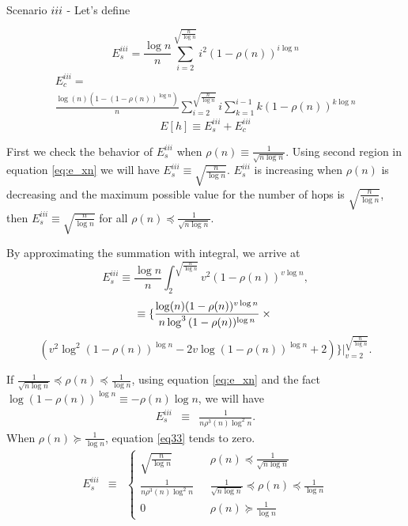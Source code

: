 \documentclass[journal]{IEEEtran}
\theoremstyle{plain}
\theoremstyle{remark}
\begin{document}
\begin{IEEEproof}
Scenario $\romannumeral 3$ - Let's define

\begin{equation}\label{eq33}
E_s^{iii}= \frac{\log n}{n}\sum_{i=2}^{\sqrt{\frac{n}{\log n}}} i^2(1-\rho(n))^{i\log n} \nonumber 
\end{equation}
\begin{eqnarray}
&E_c^{iii}= & \nonumber \\
&\frac{\log (n)(1-(1-\rho(n))^{\log n})}{n}\sum_{i=2}^{\sqrt{\frac{n}{\log n}}}i\sum_{k=1}^{i-1}k(1-\rho(n))^{k\log n}& \nonumber 
\end{eqnarray}
\begin{equation}
E[h]\equiv E_s^{iii}+E_c^{iii}
	\end{equation}
	
	First we check the behavior of $E_s^{iii}$ when $\rho(n)\equiv \frac{1}{\sqrt{n\log n}}$. Using second region in equation \eqref{eq:e_xn} we will have $E_s^{iii}\equiv \sqrt{\frac{n}{\log n}}$. $E_s^{iii}$ is increasing when $\rho(n)$ is decreasing and the maximum possible value for the number of hops is $\sqrt{\frac{n}{\log n}}$, then $E_s^{iii} \equiv \sqrt{\frac{n}{\log n}}$ for all $\rho(n) \preceq \frac{1}{\sqrt{n\log n}}$.
	
	By approximating the summation with integral, we arrive at
	\begin{equation}
	E_s^{iii}\equiv \frac{\log n}{n}\int_2^{\sqrt{\frac{n}{\log n}}} v^2(1-\rho(n))^{v\log n}, \nonumber 
	\end{equation}
\begin{equation}
	\equiv \{\frac{\log (n)(1-\rho(n))^{v\log n}}{n\log^3 {(1-\rho(n))^{\log n}}} \times  \nonumber \\
	\end{equation}
	\begin{equation}
	(v^2\log^2 {(1-\rho(n))^{\log n}}-2v\log {(1-\rho(n))^{\log n}} +2)\}|_{v=2}^{\sqrt{\frac{n}{\log n}}}. 
	\end{equation}

	If $\frac{1}{\sqrt{n\log n}} \preceq \rho(n) \preceq \frac{1}{\log n}$, using equation \eqref{eq:e_xn} and the fact $\log {(1-\rho(n))^{\log n}}\equiv -\rho(n)\log n$, we will have
	\begin{eqnarray}
	E_s^{iii}&\equiv& \frac{1}{n\rho^3(n) \log^2 n}.
	\end{eqnarray}	
	When $\rho(n) \succeq \frac{1}{\log n}$, equation \eqref{eq33} tends to zero.
	\begin{eqnarray}
	E_s^{iii}&\equiv& \left\{\begin{array}{ll}
					\sqrt{\frac{n}{\log n}}& \ \ \  \rho(n)\preceq \frac{1}{\sqrt{n\log n}} \\
					\frac{1}{n\rho^3(n) \log^2 n}& \ \ \  \frac{1}{\sqrt{n\log n}} \preceq \rho(n)\preceq \frac{1}{\log n} \\
					0& \ \ \ \rho(n)\succeq \frac{1}{\log n}
			\end{array}\right . 
	\end{eqnarray}


\end{IEEEproof}
\end{document}
